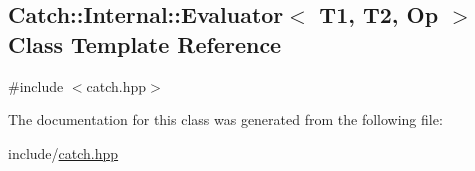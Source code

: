 \hypertarget{classCatch_1_1Internal_1_1Evaluator}{\subsection{Catch\-:\-:Internal\-:\-:Evaluator$<$ T1, T2, Op $>$ Class Template Reference}
\label{classCatch_1_1Internal_1_1Evaluator}
}


{\ttfamily \#include $<$catch.\-hpp$>$}



The documentation for this class was generated from the following file\-:\begin{DoxyCompactItemize}
\item 
include/\hyperlink{catch_8hpp}{catch.\-hpp}\end{DoxyCompactItemize}
